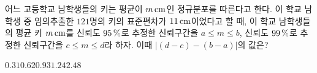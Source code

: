 어느 고등학교 남학생들의 키는 평균이 $m\mkern3mu \mathrm{cm}$인 정규분포를 따른다고 한다. 이 학교 남학생 중 임의추출한 $121$명의 키의 표준편차가 $11\mkern3mu \mathrm{cm}$이었다고 할 때, 이 학교 남학생들의 평균 키 $m\mkern3mu \mathrm{cm}$를 신뢰도 $95\mkern3mu \%$로 추정한 신뢰구간을 $a\le m\le b$, 신뢰도 $99\mkern3mu \%$로 추정한 신뢰구간을 $c\le m\le d$라 하자. 이때 $|(d-c)-(b-a)|$의 값은? 
\begin{choices32}{$0.31$}{$0.62$}{$0.93$}{$1.24$}{$2.48$}\end{choices32}
